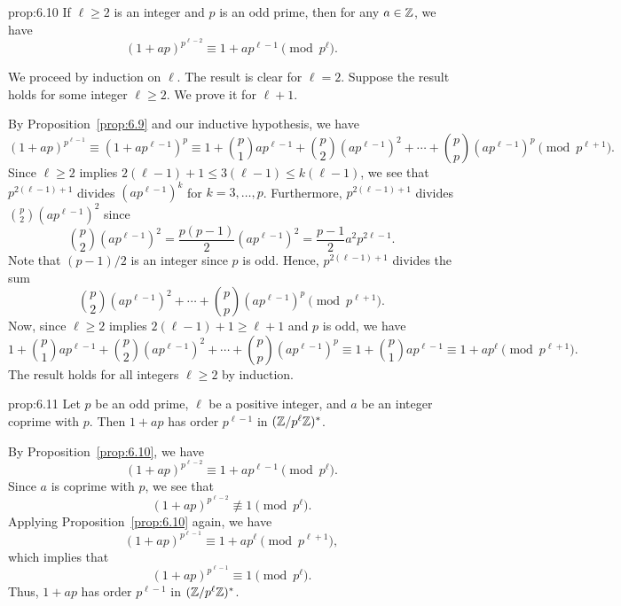 \begin{prop}{prop:6.10}
    If $\ell \geq 2$ is an integer and $p$ is an odd prime, then for any 
    $a \in \mathbb{Z}$, we have 
    \[ (1+ap)^{p^{\ell-2}} \equiv 1 + ap^{\ell-1} \pmod{p^\ell}. \] 
\end{prop}
\begin{pf}
    We proceed by induction on $\ell$. The result is clear for $\ell = 2$. 
    Suppose the result holds for some integer $\ell \geq 2$. We prove it for 
    $\ell + 1$. 

    By Proposition~\ref{prop:6.9} and our inductive hypothesis, we have 
    \[ (1 + ap)^{p^{\ell-1}} \equiv (1 + ap^{\ell-1})^p 
    \equiv 1 + \binom{p}{1} ap^{\ell-1} + \binom{p}{2} (ap^{\ell-1})^2 
    + \cdots + \binom{p}{p} (ap^{\ell-1})^p \pmod{p^{\ell+1}}. \] 
    Since $\ell \geq 2$ implies $2(\ell-1) + 1 \leq 3(\ell-1) \leq k(\ell-1)$, 
    we see that $p^{2(\ell-1)+1}$ divides $(ap^{\ell-1})^k$ for $k = 3, \dots, p$. 
    Furthermore, $p^{2(\ell-1)+1}$ divides $\binom{p}{2}(ap^{\ell-1})^2$ since 
    \[ \binom{p}{2} (ap^{\ell-1})^2 = \frac{p(p-1)}2 (ap^{\ell-1})^2 
    = \frac{p-1}2 a^2 p^{2\ell-1}. \] 
    Note that $(p-1)/2$ is an integer since $p$ is odd. Hence, $p^{2(\ell-1)+1}$ 
    divides the sum 
    \[ \binom{p}{2} (ap^{\ell-1})^2 + \cdots + \binom{p}{p} (ap^{\ell-1})^p 
    \pmod{p^{\ell+1}}. \] 
    Now, since $\ell \geq 2$ implies $2(\ell-1) + 1 \geq \ell+1$ and $p$ is odd, 
    we have 
    \[ 1 + \binom{p}{1} ap^{\ell-1} + \binom{p}{2} (ap^{\ell-1})^2 
    + \cdots + \binom{p}{p} (ap^{\ell-1})^p \equiv 1 + \binom{p}{1} ap^{\ell-1}
    \equiv 1 + ap^\ell \pmod{p^{\ell+1}}. \] 
    The result holds for all integers $\ell \geq 2$ by induction. 
\end{pf}

\begin{prop}{prop:6.11}
    Let $p$ be an odd prime, $\ell$ be a positive integer, and $a$ be an integer 
    coprime with $p$. Then $1 + ap$ has order $p^{\ell-1}$ in $(\mathbb{Z}/p^\ell\mathbb{Z})^*$. 
\end{prop}
\begin{pf}
    By Proposition~\ref{prop:6.10}, we have 
    \[ (1+ap)^{p^{\ell-2}} \equiv 1 + ap^{\ell-1} \pmod{p^\ell}. \] 
    Since $a$ is coprime with $p$, we see that 
    \[ (1+ap)^{p^{\ell-2}} \not\equiv 1 \pmod{p^\ell}. \] 
    Applying Proposition~\ref{prop:6.10} again, we have 
    \[ (1+ap)^{p^{\ell-1}} \equiv 1 + ap^\ell \pmod{p^{\ell+1}}, \] 
    which implies that 
    \[ (1+ap)^{p^{\ell-1}} \equiv 1 \pmod{p^\ell}. \] 
    Thus, $1 + ap$ has order $p^{\ell-1}$ in $(\mathbb{Z}/p^\ell\mathbb{Z})^*$. 
\end{pf}

